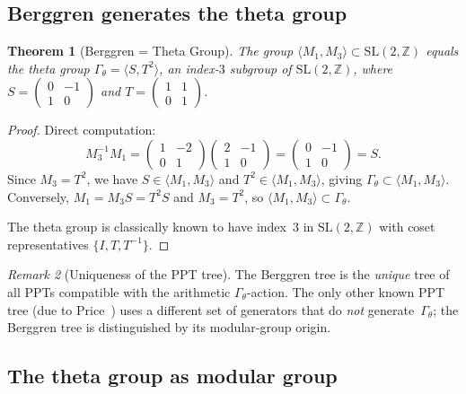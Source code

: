 \documentclass[12pt]{amsart}
\newtheorem{theorem}{Theorem}[section]
\theoremstyle{definition}
\theoremstyle{remark}
\newtheorem{remark}[theorem]{Remark}
\newcommand{\SL}{\mathrm{SL}}
\newcommand{\Z}{\mathbb{Z}}
\newcommand{\Gtheta}{\Gamma_\theta}
\begin{document}
\subsection{Berggren generates the theta group}

\begin{theorem}[Berggren = Theta Group]\label{thm:theta}
The group $\langle M_1, M_3 \rangle \subset \SL(2,\Z)$ equals the
theta group $\Gtheta = \langle S, T^2 \rangle$, an index-$3$ subgroup
of\/ $\SL(2,\Z)$, where $S = \left(\begin{smallmatrix}0&-1\\1&0
\end{smallmatrix}\right)$ and $T = \left(\begin{smallmatrix}1&1\\0&1
\end{smallmatrix}\right)$.
\end{theorem}

\begin{proof}
Direct computation:
\[
M_3^{-1} M_1
= \begin{pmatrix}1&-2\\0&1\end{pmatrix}
  \begin{pmatrix}2&-1\\1&0\end{pmatrix}
= \begin{pmatrix}0&-1\\1&0\end{pmatrix}
= S.
\]
Since $M_3 = T^2$, we have $S \in \langle M_1, M_3\rangle$ and
$T^2 \in \langle M_1, M_3\rangle$, giving
$\Gtheta \subset \langle M_1, M_3\rangle$.
Conversely, $M_1 = M_3 S = T^2 S$ and $M_3 = T^2$, so
$\langle M_1, M_3\rangle \subset \Gtheta$.

The theta group is classically known to have index~3 in $\SL(2,\Z)$
with coset representatives $\{I, T, T^{-1}\}$.
\end{proof}

\begin{remark}[Uniqueness of the PPT tree]
The Berggren tree is the \emph{unique} tree of all PPTs compatible with
the arithmetic $\Gtheta$-action.  The only other known PPT tree
(due to Price~\cite{price}) uses a different set of generators that do
\emph{not} generate~$\Gtheta$; the Berggren tree is distinguished by
its modular-group origin.
\end{remark}

\subsection{The theta group as modular group}
\end{document}
